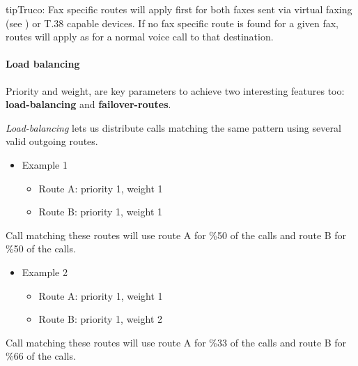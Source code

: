 \documentclass[letterpaper,10pt,spanish]{sphinxmanual}
\begin{document}
\begin{notice}{tip}{Truco:}
Fax specific routes will apply first for both faxes sent via virtual faxing (see {\hyperref[administration_portal/client/vpbx/faxes:faxes]{}}) or T.38 capable devices.
If no fax specific route is found for a given fax, routes will apply as for a normal voice call to that destination.
\end{notice}


\paragraph{Load balancing}
\label{administration_portal/brand/routing/outgoing_routings:load-balancing}
Priority and weight, are key parameters to achieve two interesting features too: \textbf{load-balancing} and \textbf{failover-routes}.

\emph{Load-balancing} lets us distribute calls matching the same pattern using
several valid outgoing routes.
\begin{itemize}
\item {} 
Example 1
\begin{itemize}
\item {} 
Route A: priority 1, weight 1

\item {} 
Route B: priority 1, weight 1

\end{itemize}

\end{itemize}

Call matching these routes will use route A for \%50 of the calls and route B for
\%50 of the calls.
\begin{itemize}
\item {} 
Example 2
\begin{itemize}
\item {} 
Route A: priority 1, weight 1

\item {} 
Route B: priority 1, weight 2

\end{itemize}

\end{itemize}

Call matching these routes will use route A for \%33 of the calls and route B for
\%66 of the calls.
\end{document}
